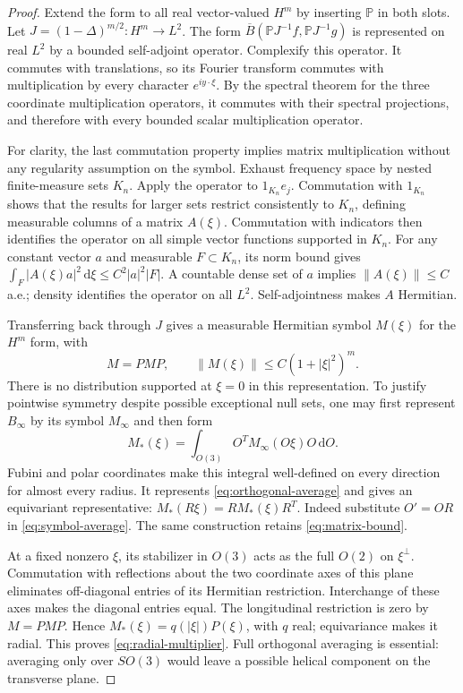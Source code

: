 \documentclass[11pt]{article}
\theoremstyle{remark}
\newcommand{\Pj}{\mathbb P}
\newcommand{\norm}[1]{\left\lVert#1\right\rVert}
\newcommand{\dd}{\,\mathrm d}
\begin{document}
\begin{proof}
Extend the form to all real vector-valued $H^m$ by inserting $\Pj$ in
both slots. Let $J=(1-\Delta)^{m/2}:H^m\to L^2$. The form
$\overline B(\Pj J^{-1}f,\Pj J^{-1}g)$ is represented on real $L^2$ by a
bounded self-adjoint operator. Complexify this operator. It commutes with
translations, so its Fourier transform commutes with multiplication by
every character $e^{iy\cdot\xi}$. By the spectral theorem for the three
coordinate multiplication operators, it commutes with their spectral
projections, and therefore with every bounded scalar multiplication
operator.

For clarity, the last commutation property implies matrix multiplication
without any regularity assumption on the symbol. Exhaust frequency space
by nested finite-measure sets $K_n$. Apply the operator to
$1_{K_n}e_j$. Commutation with $1_{K_n}$ shows that the results for larger
sets restrict consistently to $K_n$, defining measurable columns of a
matrix $A(\xi)$. Commutation with indicators then identifies the operator
on all simple vector functions supported in $K_n$. For any constant vector
$a$ and measurable $F\subset K_n$, its norm bound gives
$\int_F|A(\xi)a|^2\dd\xi\le C^2|a|^2|F|$.
A countable dense set of $a$ implies $\norm{A(\xi)}\le C$ a.e.; density
identifies the operator on all $L^2$. Self-adjointness makes $A$ Hermitian.

Transferring back through $J$ gives a measurable Hermitian symbol
$M(\xi)$ for the $H^m$ form, with
\begin{equation}
 M=PMP,\qquad \norm{M(\xi)}\le C(1+|\xi|^2)^m.\label{eq:matrix-bound}
\end{equation}
There is no distribution supported at $\xi=0$ in this representation.
To justify pointwise symmetry despite possible exceptional null sets,
one may first represent $B_\infty$ by its symbol $M_\infty$ and then form
\begin{equation}
 M_*(\xi)=\int_{O(3)}O^T M_\infty(O\xi)O\dd O.\label{eq:symbol-average}
\end{equation}
Fubini and polar coordinates make this integral well-defined on every
direction for almost every radius. It represents
\eqref{eq:orthogonal-average} and gives an equivariant representative:
$M_*(R\xi)=R M_*(\xi)R^T$. Indeed substitute $O'=OR$ in
\eqref{eq:symbol-average}. The same construction retains
\eqref{eq:matrix-bound}.

At a fixed nonzero $\xi$, its stabilizer in $O(3)$ acts as the full $O(2)$
on $\xi^\perp$. Commutation with reflections about the two coordinate
axes of this plane eliminates off-diagonal entries of its Hermitian
restriction. Interchange of these axes makes the diagonal entries equal.
The longitudinal restriction is zero by $M=PMP$. Hence
$M_*(\xi)=q(|\xi|)P(\xi)$, with $q$ real; equivariance makes it radial.
This proves \eqref{eq:radial-multiplier}. Full orthogonal averaging is
essential: averaging only over $SO(3)$ would leave a possible helical
component on the transverse plane.
\end{proof}
\end{document}
